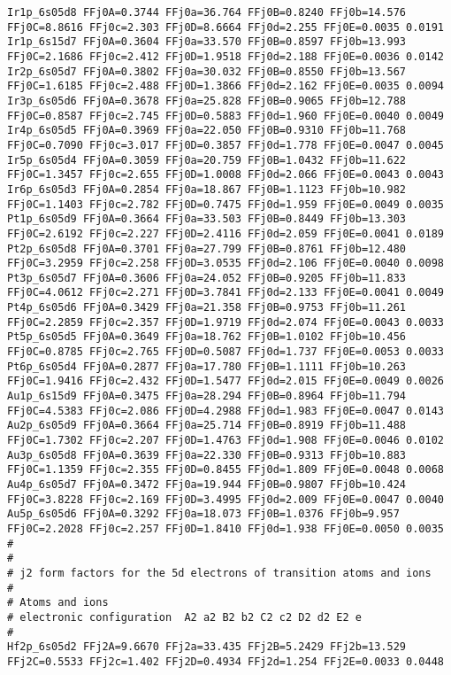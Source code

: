 {\begin{verbatim}
Ir1p_6s05d8 FFj0A=0.3744 FFj0a=36.764 FFj0B=0.8240 FFj0b=14.576 FFj0C=8.8616 FFj0c=2.303 FFj0D=8.6664 FFj0d=2.255 FFj0E=0.0035 0.0191
Ir1p_6s15d7 FFj0A=0.3604 FFj0a=33.570 FFj0B=0.8597 FFj0b=13.993 FFj0C=2.1686 FFj0c=2.412 FFj0D=1.9518 FFj0d=2.188 FFj0E=0.0036 0.0142
Ir2p_6s05d7 FFj0A=0.3802 FFj0a=30.032 FFj0B=0.8550 FFj0b=13.567 FFj0C=1.6185 FFj0c=2.488 FFj0D=1.3866 FFj0d=2.162 FFj0E=0.0035 0.0094
Ir3p_6s05d6 FFj0A=0.3678 FFj0a=25.828 FFj0B=0.9065 FFj0b=12.788 FFj0C=0.8587 FFj0c=2.745 FFj0D=0.5883 FFj0d=1.960 FFj0E=0.0040 0.0049
Ir4p_6s05d5 FFj0A=0.3969 FFj0a=22.050 FFj0B=0.9310 FFj0b=11.768 FFj0C=0.7090 FFj0c=3.017 FFj0D=0.3857 FFj0d=1.778 FFj0E=0.0047 0.0045
Ir5p_6s05d4 FFj0A=0.3059 FFj0a=20.759 FFj0B=1.0432 FFj0b=11.622 FFj0C=1.3457 FFj0c=2.655 FFj0D=1.0008 FFj0d=2.066 FFj0E=0.0043 0.0043
Ir6p_6s05d3 FFj0A=0.2854 FFj0a=18.867 FFj0B=1.1123 FFj0b=10.982 FFj0C=1.1403 FFj0c=2.782 FFj0D=0.7475 FFj0d=1.959 FFj0E=0.0049 0.0035
Pt1p_6s05d9 FFj0A=0.3664 FFj0a=33.503 FFj0B=0.8449 FFj0b=13.303 FFj0C=2.6192 FFj0c=2.227 FFj0D=2.4116 FFj0d=2.059 FFj0E=0.0041 0.0189
Pt2p_6s05d8 FFj0A=0.3701 FFj0a=27.799 FFj0B=0.8761 FFj0b=12.480 FFj0C=3.2959 FFj0c=2.258 FFj0D=3.0535 FFj0d=2.106 FFj0E=0.0040 0.0098
Pt3p_6s05d7 FFj0A=0.3606 FFj0a=24.052 FFj0B=0.9205 FFj0b=11.833 FFj0C=4.0612 FFj0c=2.271 FFj0D=3.7841 FFj0d=2.133 FFj0E=0.0041 0.0049
Pt4p_6s05d6 FFj0A=0.3429 FFj0a=21.358 FFj0B=0.9753 FFj0b=11.261 FFj0C=2.2859 FFj0c=2.357 FFj0D=1.9719 FFj0d=2.074 FFj0E=0.0043 0.0033
Pt5p_6s05d5 FFj0A=0.3649 FFj0a=18.762 FFj0B=1.0102 FFj0b=10.456 FFj0C=0.8785 FFj0c=2.765 FFj0D=0.5087 FFj0d=1.737 FFj0E=0.0053 0.0033
Pt6p_6s05d4 FFj0A=0.2877 FFj0a=17.780 FFj0B=1.1111 FFj0b=10.263 FFj0C=1.9416 FFj0c=2.432 FFj0D=1.5477 FFj0d=2.015 FFj0E=0.0049 0.0026
Au1p_6s15d9 FFj0A=0.3475 FFj0a=28.294 FFj0B=0.8964 FFj0b=11.794 FFj0C=4.5383 FFj0c=2.086 FFj0D=4.2988 FFj0d=1.983 FFj0E=0.0047 0.0143
Au2p_6s05d9 FFj0A=0.3664 FFj0a=25.714 FFj0B=0.8919 FFj0b=11.488 FFj0C=1.7302 FFj0c=2.207 FFj0D=1.4763 FFj0d=1.908 FFj0E=0.0046 0.0102
Au3p_6s05d8 FFj0A=0.3639 FFj0a=22.330 FFj0B=0.9313 FFj0b=10.883 FFj0C=1.1359 FFj0c=2.355 FFj0D=0.8455 FFj0d=1.809 FFj0E=0.0048 0.0068
Au4p_6s05d7 FFj0A=0.3472 FFj0a=19.944 FFj0B=0.9807 FFj0b=10.424 FFj0C=3.8228 FFj0c=2.169 FFj0D=3.4995 FFj0d=2.009 FFj0E=0.0047 0.0040
Au5p_6s05d6 FFj0A=0.3292 FFj0a=18.073 FFj0B=1.0376 FFj0b=9.957  FFj0C=2.2028 FFj0c=2.257 FFj0D=1.8410 FFj0d=1.938 FFj0E=0.0050 0.0035
#
#
# j2 form factors for the 5d electrons of transition atoms and ions 
#
# Atoms and ions
# electronic configuration  A2 a2 B2 b2 C2 c2 D2 d2 E2 e
#
Hf2p_6s05d2 FFj2A=9.6670 FFj2a=33.435 FFj2B=5.2429 FFj2b=13.529 FFj2C=0.5533 FFj2c=1.402 FFj2D=0.4934 FFj2d=1.254 FFj2E=0.0033 0.0448 

\end{verbatim}}
